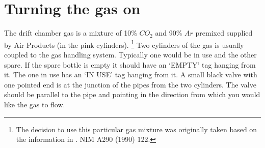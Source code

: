 \documentclass[11pt]{report}
\begin{document}
\section{Turning the gas on}

The drift chamber gas is a mixture of 10\% $CO_{2}$  and 90\% $Ar$ premixed 
supplied by Air Products (in the pink cylinders). 
\footnote{The decision to use this particular gas mixture was originally taken based on the information in 
\cite{But90}. NIM A290 (1990) 122.}
Two cylinders of the gas 
is usually coupled to the gas handling  system. Typically one would be in 
use and the other spare. If the spare bottle is empty it should have an 
`EMPTY' tag hanging from it. The one in use has an `IN USE' tag hanging 
from it. A small black valve with one pointed end is at the junction of the 
pipes from the two cylinders. The valve should be parallel to the pipe and
pointing in the direction from which you would like the gas to flow.

\bigskip
{}
\end{document}
